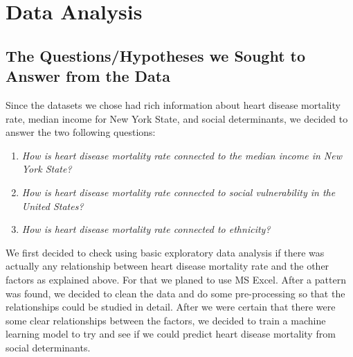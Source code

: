 \documentclass[journal,12pt,onecolumn]{IEEEtran}
\begin{document}
\section{Data Analysis}

\subsection{The Questions/Hypotheses we Sought to Answer from the Data}
Since the datasets we chose had rich information about heart disease mortality rate, median income for New York State, and social determinants, we decided to answer the two following questions:
\begin{enumerate}
\item \emph{How is heart disease mortality rate connected to the median income in New York State?}
\item \emph{How is heart disease mortality rate connected to social vulnerability in the United States?}
\item \emph{How is heart disease mortality rate connected to ethnicity?}
\end{enumerate} 

We first decided to check using basic exploratory data analysis if there was actually any relationship between heart disease mortality rate and the other factors as explained above.  
For that we planed to use MS Excel.
After a pattern was found, we decided to clean the data and do some pre-processing so that the relationships could be studied in detail.
After we were certain that there were some clear relationships between the factors, we decided to train a machine learning model to try and see if we could predict heart disease mortality from social determinants.
\end{document}
